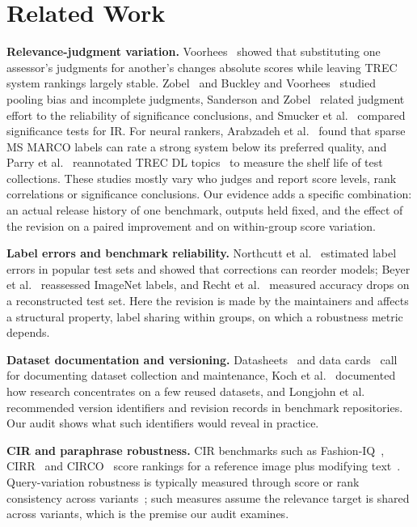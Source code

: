 \documentclass[conference]{IEEEtran}
\begin{document}
\section{Related Work}
\textbf{Relevance-judgment variation.} Voorhees~\cite{voorhees2000} showed that substituting one assessor's judgments for another's changes absolute scores while leaving TREC system rankings largely stable. Zobel~\cite{zobel1998} and Buckley and Voorhees~\cite{buckley2004} studied pooling bias and incomplete judgments, Sanderson and Zobel~\cite{sanderson2005} related judgment effort to the reliability of significance conclusions, and Smucker et al.~\cite{smucker2007} compared significance tests for IR. For neural rankers, Arabzadeh et al.~\cite{arabzadeh2022} found that sparse MS MARCO labels can rate a strong system below its preferred quality, and Parry et al.~\cite{parry2025} reannotated TREC DL topics~\cite{trecdl2019} to measure the shelf life of test collections. These studies mostly vary who judges and report score levels, rank correlations or significance conclusions. Our evidence adds a specific combination: an actual release history of one benchmark, outputs held fixed, and the effect of the revision on a paired improvement and on within-group score variation.

\textbf{Label errors and benchmark reliability.} Northcutt et al.~\cite{northcutt2021} estimated label errors in popular test sets and showed that corrections can reorder models; Beyer et al.~\cite{beyer2020} reassessed ImageNet labels, and Recht et al.~\cite{recht2019} measured accuracy drops on a reconstructed test set. Here the revision is made by the maintainers and affects a structural property, label sharing within groups, on which a robustness metric depends.

\textbf{Dataset documentation and versioning.} Datasheets~\cite{gebru2021} and data cards~\cite{pushkarna2022} call for documenting dataset collection and maintenance, Koch et al.~\cite{koch2021} documented how research concentrates on a few reused datasets, and Longjohn et al.~\cite{longjohn2024} recommended version identifiers and revision records in benchmark repositories. Our audit shows what such identifiers would reveal in practice.

\textbf{CIR and paraphrase robustness.} CIR benchmarks such as Fashion-IQ~\cite{fashioniq}, CIRR~\cite{cirr} and CIRCO~\cite{circo} score rankings for a reference image plus modifying text~\cite{tirg}. Query-variation robustness is typically measured through score or rank consistency across variants~\cite{penha2022,prsm}; such measures assume the relevance target is shared across variants, which is the premise our audit examines.
\end{document}
